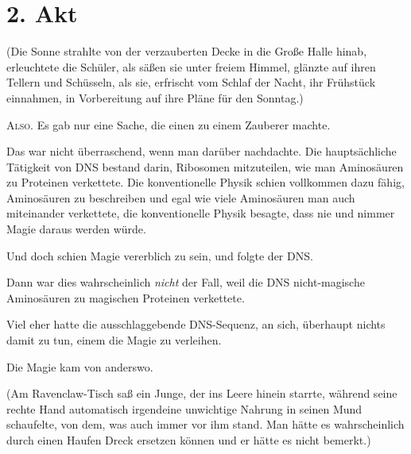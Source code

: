\section{2. Akt}
(Die Sonne strahlte von der verzauberten Decke in die Große Halle hinab, erleuchtete die Schüler, als säßen sie unter freiem Himmel, glänzte auf ihren Tellern und Schüsseln, als sie, erfrischt vom Schlaf der Nacht, ihr Frühstück einnahmen, in Vorbereitung auf ihre Pläne für den Sonntag.)

\lettrine{A}{lso.} Es gab nur eine Sache, die einen zu einem Zauberer machte.

Das war nicht überraschend, wenn man darüber nachdachte. Die hauptsächliche Tätigkeit von DNS bestand darin, Ribosomen mitzuteilen, wie man Aminosäuren zu Proteinen verkettete. Die konventionelle Physik schien vollkommen dazu fähig, Aminosäuren zu beschreiben und egal wie viele Aminosäuren man auch miteinander verkettete, die konventionelle Physik besagte, dass nie und nimmer Magie daraus werden würde.

Und doch schien Magie vererblich zu sein, und folgte der DNS.

Dann war dies wahrscheinlich \emph{nicht} der Fall, weil die DNS nicht-magische Aminosäuren zu magischen Proteinen verkettete.

Viel eher hatte die ausschlaggebende DNS-Sequenz, an sich, überhaupt nichts damit zu tun, einem die Magie zu verleihen.

Die Magie kam von anderswo.

(Am Ravenclaw-Tisch saß ein Junge, der ins Leere hinein starrte, während seine rechte Hand automatisch irgendeine unwichtige Nahrung in seinen Mund schaufelte, von dem, was auch immer vor ihm stand. Man hätte es wahrscheinlich durch einen Haufen Dreck ersetzen können und er hätte es nicht bemerkt.)

